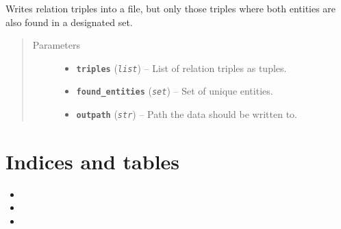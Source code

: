 \documentclass[letterpaper,10pt,english]{sphinxmanual}
\begin{document}
\begin{fulllineitems}
\label{src.trans_e:src.trans_e.trans_we.write_data}
Writes relation triples into a file, but only those triples where both entities are also found in a designated
set.
\begin{quote}\begin{description}
\item[{Parameters}] \leavevmode\begin{itemize}
\item {} 
\textbf{\texttt{triples}} (\emph{\texttt{list}}) -- List of relation triples as tuples.

\item {} 
\textbf{\texttt{found\_entities}} (\emph{\texttt{set}}) -- Set of unique entities.

\item {} 
\textbf{\texttt{outpath}} (\emph{\texttt{str}}) -- Path the data should be written to.

\end{itemize}

\end{description}\end{quote}

\end{fulllineitems}



\chapter{Indices and tables}
\label{index:indices-and-tables}\begin{itemize}
\item {} 

\item {} 

\item {} 

\end{itemize}
\end{document}
